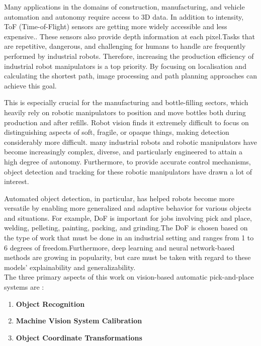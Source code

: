 \documentclass[12pt]{article}
\begin{document}
Many applications in the domains of construction, manufacturing, and vehicle automation and autonomy require access to 3D data. In addition to intensity, ToF (Time-of-Flight) sensors are getting more widely accessible and less expensive.. These sensors also provide depth information at each pixel.Tasks that are repetitive, dangerous, and challenging for humans to handle are frequently performed by industrial robots. Therefore, increasing the production efficiency of industrial robot manipulators is a top priority. By focusing on localisation and calculating the shortest path, image processing and path planning approaches can achieve this goal.  

This is especially crucial for the manufacturing and bottle-filling sectors, which heavily rely on robotic manipulators to position and move bottles both during production and after refills. Robot vision finds it extremely difficult to focus on distinguishing aspects of soft, fragile, or opaque things, making detection considerably more difficult. many industrial robots and robotic manipulators have become increasingly complex, diverse, and particularly engineered to attain a high degree of autonomy. Furthermore, to provide accurate control mechanisms, object detection and tracking for these robotic manipulators have drawn a lot of interest\cite{ref2, ref12}.

Automated object detection, in particular, has helped robots become more versatile by enabling more generalized and adaptive behavior for various objects and situations. For example, DoF is important for jobs involving pick and place, welding, pelleting, painting, packing, and grinding.The DoF is chosen based on the type of work that must be done in an industrial setting and ranges from 1 to 6 degrees of freedom.Furthermore, deep learning and neural network-based methods are growing in popularity, but care must be taken with regard to these models' explainability and generalizability\cite{ref12}.\\


The three primary aspects of this work on vision-based automatic pick-and-place systems are \cite{ref12}:
\begin{enumerate}
  \item \textbf{Object Recognition}
  \item \textbf{Machine Vision System Calibration}
  \item \textbf{Object Coordinate Transformations}
\end{enumerate}
\end{document}
